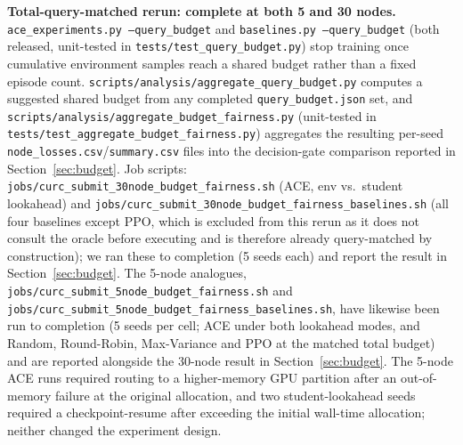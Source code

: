 \textbf{Total-query-matched rerun: complete at both 5 and 30 nodes.} \texttt{ace\_experiments.py --query\_budget} and \texttt{baselines.py --query\_budget} (both released, unit-tested in \texttt{tests/test\_query\_budget.py}) stop training once cumulative environment samples reach a shared budget rather than a fixed episode count. \texttt{scripts/analysis/aggregate\_query\_budget.py} computes a suggested shared budget from any completed \texttt{query\_budget.json} set, and \texttt{scripts/analysis/aggregate\_budget\_fairness.py} (unit-tested in \texttt{tests/test\_aggregate\_budget\_fairness.py}) aggregates the resulting per-seed \texttt{node\_losses.csv}/\texttt{summary.csv} files into the decision-gate comparison reported in Section~\ref{sec:budget}. Job scripts: \texttt{jobs/curc\_submit\_30node\_budget\_fairness.sh} (ACE, env vs.\ student lookahead) and \texttt{jobs/curc\_submit\_30node\_budget\_fairness\_baselines.sh} (all four baselines except PPO, which is excluded from this rerun as it does not consult the oracle before executing and is therefore already query-matched by construction); we ran these to completion (5 seeds each) and report the result in Section~\ref{sec:budget}. The 5-node analogues, \texttt{jobs/curc\_submit\_5node\_budget\_fairness.sh} and \texttt{jobs/curc\_submit\_5node\_budget\_fairness\_baselines.sh}, have likewise been run to completion (5 seeds per cell; ACE under both lookahead modes, and Random, Round-Robin, Max-Variance and PPO at the matched total budget) and are reported alongside the 30-node result in Section~\ref{sec:budget}. The 5-node ACE runs required routing to a higher-memory GPU partition after an out-of-memory failure at the original allocation, and two student-lookahead seeds required a checkpoint-resume after exceeding the initial wall-time allocation; neither changed the experiment design.

